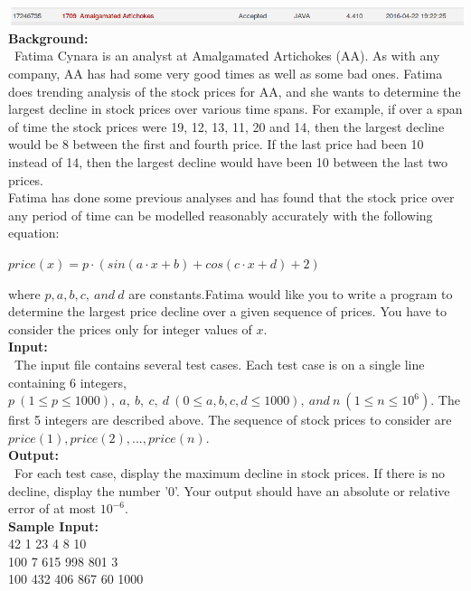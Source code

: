 \documentclass[12pt]{article}
\begin{document}
\includegraphics[width=\textwidth]{ProblemA} \\

\noindent \textbf{Background:} \\
~\indent Fatima Cynara is an analyst at Amalgamated Artichokes (AA). As with any company, AA has had some
very good times as well as some bad ones. Fatima does trending analysis of the stock prices for AA, and she
wants to determine the largest decline in stock prices over various time spans. For example, if over a span
of time the stock prices were 19, 12, 13, 11, 20 and 14, then the largest decline would be 8 between the first
and fourth price. If the last price had been 10 instead of 14, then the largest decline would have been 10
between the last two prices. \\
\indent Fatima has done some previous analyses and has found that the stock price over any period of time can
be modelled reasonably accurately with the following equation:
\begin{center}$price(x) = p \cdot (sin(a\cdot x + b) + cos(c\cdot x + d) + 2)$\end{center}
where $p,a,b,c,\ and\ d$ are constants.Fatima would like you to write a program to determine the largest
price decline over a given sequence of prices. You have to consider the prices only for integer values of $x$. \\

\noindent \textbf{Input:} \\
~\indent The input file contains several test cases. Each test case is on a single line containing 6 integers,
$p\ (1 \leq p \leq 1000),\ a,\ b,\ c,\ d\ (0 \leq a,b,c,d \leq 1000),\ and\ n\ (1 \leq n \leq 10^6)$. The first
5 integers are described above. The sequence of stock prices to consider are $price(1), price(2),..., price(n).$ \\

\noindent \textbf{Output:} \\
~\indent For each test case, display the maximum decline in stock prices. If there is no decline, display the
number '0'. Your output should have an absolute or relative error of at most $10^{-6}$. \\

\noindent \textbf{Sample Input:} \\
42 1 23 4 8 10  \\
100 7 615 998 801 3  \\
100 432 406 867 60 1000  \\
\end{document}
